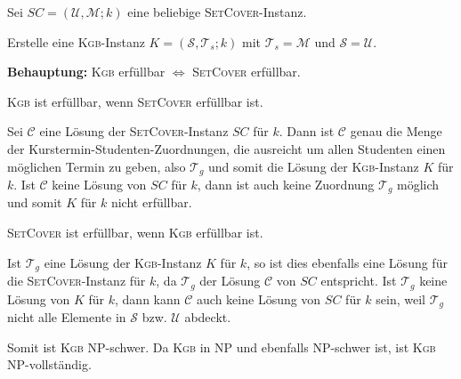 \documentclass{article}
\begin{document}
\smallskip

Sei $SC = (\mathcal{U, M}; k)$ eine beliebige \textsc{SetCover}-Instanz.

Erstelle eine \textsc{Kgb}-Instanz $K = (\mathcal{S}, \mathcal{T}_s; k)$ mit $\mathcal{T}_s = \mathcal{M}$ und $\mathcal{S} = \mathcal{U}$. 

\smallskip

\textbf{Behauptung:} \textsc{Kgb} erfüllbar $\Leftrightarrow$ \textsc{SetCover} erfüllbar.

\smallskip

\textsc{Kgb} ist erfüllbar, wenn \textsc{SetCover} erfüllbar ist.

Sei $\mathcal{C}$ eine Lösung der \textsc{SetCover}-Instanz $SC$ für $k$. Dann ist $\mathcal{C}$ genau die Menge der Kurstermin-Studenten-Zuordnungen, die ausreicht um allen Studenten einen möglichen Termin zu geben, also $\mathcal{T}_g$ und somit die Lösung der \textsc{Kgb}-Instanz $K$ für $k$.
Ist $\mathcal{C}$ keine Lösung von $SC$ für $k$, dann ist auch keine Zuordnung $\mathcal{T}_g$ möglich und somit $K$ für $k$ nicht erfüllbar.

\smallskip

\textsc{SetCover} ist erfüllbar, wenn \textsc{Kgb} erfüllbar ist.

Ist $\mathcal{T}_g$ eine Lösung der \textsc{Kgb}-Instanz $K$ für $k$, so ist dies ebenfalls eine Lösung für die \textsc{SetCover}-Instanz für $k$, da $\mathcal{T}_g$ der Lösung $\mathcal{C}$ von $SC$ entspricht.
Ist $\mathcal{T}_g$ keine Lösung von $K$ für $k$, dann kann $\mathcal{C}$ auch keine Lösung von $SC$ für $k$ sein, weil $\mathcal{T}_g$ nicht alle Elemente in $\mathcal{S}$ bzw. $\mathcal{U}$ abdeckt.

\bigskip

Somit ist \textsc{Kgb} NP-schwer. Da \textsc{Kgb} in NP und ebenfalls NP-schwer ist, ist \textsc{Kgb} NP-vollständig.
\end{document}
